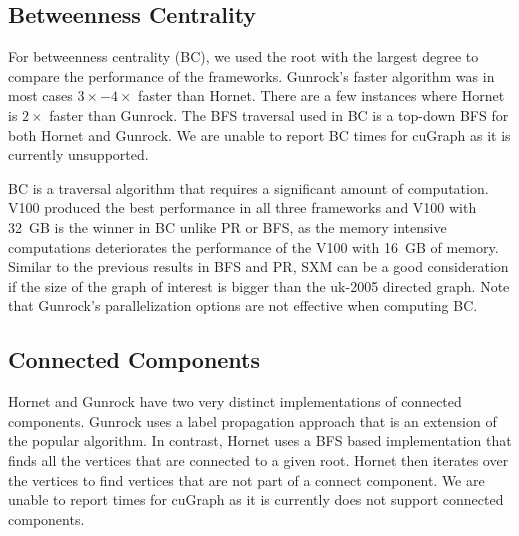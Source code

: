 

\subsection{Betweenness Centrality}

For betweenness centrality (BC), we used the root with the largest degree to compare the performance of the frameworks. Gunrock's faster algorithm was in most cases $3\times-4\times$ faster than Hornet. There are a few instances where Hornet is $2\times$ faster than Gunrock. The BFS traversal used in BC is a top-down BFS for both Hornet and Gunrock. We are unable to report BC times for cuGraph as it is currently unsupported.

BC is a traversal algorithm that requires a significant amount of computation. V100 produced the best performance in all three frameworks and V100 with 32~GB is the winner in BC unlike PR or BFS, as the memory intensive computations deteriorates the performance of the V100 with 16~GB of memory. Similar to the previous results in BFS and PR, SXM can be a good consideration if the size of the graph of interest is bigger than the uk-2005 directed graph. Note that Gunrock's parallelization options are not effective when computing BC\@.


\subsection{Connected Components}

Hornet and Gunrock have two very distinct implementations of connected components. Gunrock uses a label propagation approach that is an extension of the popular \cite{ShiloachVishkin} algorithm. In contrast, Hornet uses a BFS based implementation that finds all the vertices that are connected to a given root. Hornet then iterates over the vertices to find vertices that are not part of a connect component. %
We are unable to report times for cuGraph as it is currently does not support connected components.

